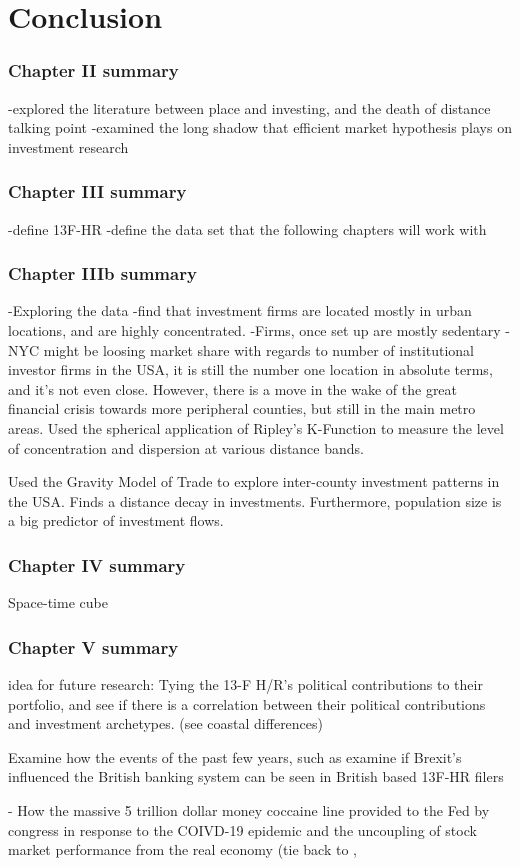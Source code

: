 \chapter {Conclusion}

\subsection{Chapter II summary}

-explored the literature between place and investing, and the death of distance talking point
-examined the long shadow that efficient market hypothesis plays on investment research
\subsection{Chapter III summary}
-define 13F-HR
-define the data set that the following chapters will work with

\subsection{Chapter IIIb summary}
-Exploring the data
-find that investment firms are located mostly in urban locations, and are highly concentrated.
-Firms, once set up are mostly sedentary
- NYC might be loosing market share with regards to number of institutional investor firms in the USA, it is still the number one location in absolute terms, and it's not even close. 
However, there is a move in the wake of the great financial crisis towards more peripheral counties, but still in the main metro areas.  
Used the spherical application of Ripley's K-Function to measure the level of concentration and dispersion at various distance bands.  

Used the Gravity Model of Trade to explore inter-county investment patterns in the USA. Finds a distance decay in investments.  Furthermore, population size is a big predictor of investment flows.


\subsection{Chapter IV summary}

Space-time cube



\subsection{Chapter V summary}


idea for future research: Tying the 13-F H/R's political contributions to their portfolio, and see if there is a correlation between their political contributions and investment archetypes. (see coastal differences) 

Examine how the events of the past few years, such as examine if Brexit's influenced the British banking system can be seen in British based 13F-HR filers

- How the massive 5 trillion dollar money coccaine line provided to the Fed by congress in response to the COIVD-19 epidemic and the uncoupling of stock market performance from the real economy (tie back to , 